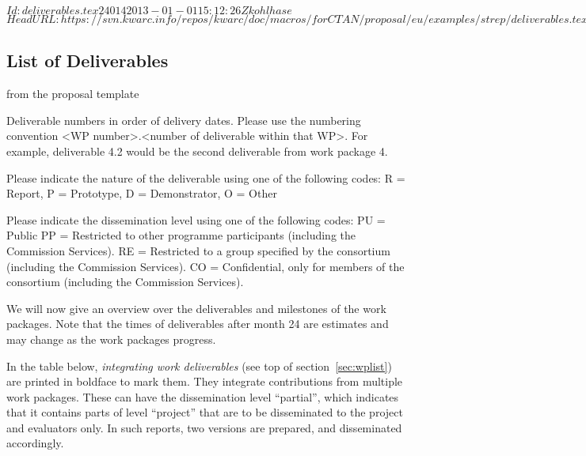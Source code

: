 \svnInfo $Id: deliverables.tex 24014 2013-01-01 15:12:26Z kohlhase $
\svnKeyword $HeadURL: https://svn.kwarc.info/repos/kwarc/doc/macros/forCTAN/proposal/eu/examples/strep/deliverables.tex $
\subsection{List of Deliverables}\label{sec:deliverables}

\begin{todo}{from the proposal template}
\begin{compactenum}
\item Deliverable numbers in order of delivery dates. Please use the numbering convention <WP number>.<number of deliverable within
that WP>. For example, deliverable 4.2 would be the second deliverable from work package 4.
\item Please indicate the nature of the deliverable using one of the following codes:
R = Report, P = Prototype, D = Demonstrator, O = Other
\item Please indicate the dissemination level using one of the following codes:
PU = Public
PP = Restricted to other programme participants (including the Commission Services).
RE = Restricted to a group specified by the consortium (including the Commission Services).
CO = Confidential, only for members of the consortium (including the Commission Services).
\end{compactenum}
\end{todo}
We will now give an overview over the deliverables and milestones of the work
packages. Note that the times of deliverables after month 24 are estimates and may change
as the work packages progress.

In the table below, {\emph{integrating work deliverables}} (see top of
section~\ref{sec:wplist}) are printed in boldface to mark them. They integrate
contributions from multiple work packages. These can have the
dissemination level ``partial'', which indicates that it contains parts of level
``project'' that are to be disseminated to the project and evaluators only. In such
reports, two versions are prepared, and disseminated accordingly.

{\footnotesize{}}


